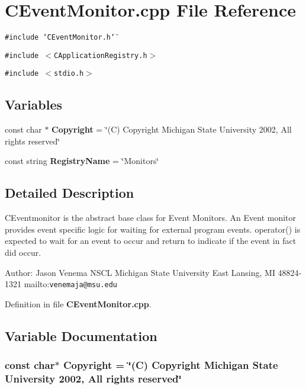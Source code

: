 \section{CEvent\-Monitor.cpp File Reference}
\label{CEventMonitor_8cpp}
{\tt \#include \char`\"{}CEvent\-Monitor.h\char`\"{}}\par
{\tt \#include $<$CApplication\-Registry.h$>$}\par
{\tt \#include $<$stdio.h$>$}\par
\subsection*{Variables}
\begin{CompactItemize}
\item 
const char $\ast$ {\bf Copyright} = \char`\"{}(C) Copyright Michigan State University 2002, All rights reserved\char`\"{}
\item 
const string {\bf Registry\-Name} = \char`\"{}Monitors\char`\"{}
\end{CompactItemize}


\subsection{Detailed Description}


CEventmonitor is the abstract base class for Event Monitors. An Event monitor provides event specific logic for waiting for external program events. operator() is expected to wait for an event to occur and return to indicate if the event  in fact did occur.

Author: Jason Venema NSCL Michigan State University East Lansing, MI 48824-1321 mailto:{\tt venemaja@msu.edu}



Definition in file {\bf CEvent\-Monitor.cpp}.

\subsection{Variable Documentation}
\subsubsection{\setlength{\rightskip}{0pt plus 5cm}const char$\ast$ Copyright = \char`\"{}(C) Copyright Michigan State University 2002, All rights reserved\char`\"{}\hspace{0.3cm}{\tt  [static]}}\label{CEventMonitor_8cpp_a0}




